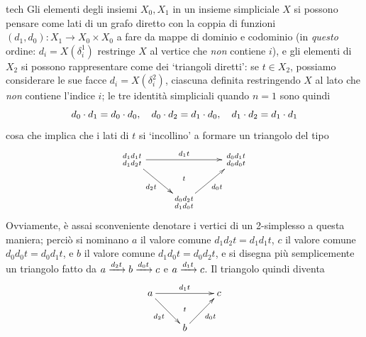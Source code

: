 \begin{hRemark}{tech}
 Gli elementi degli insiemi \(X_0, X_1\) in un insieme simpliciale \(X\) si possono pensare come lati di un grafo diretto con la coppia di funzioni \((d_1,d_0) \colon X_1 \to X_0\times X_0\) a fare da mappe di dominio e codominio (in \emph{questo} ordine: \(d_i = X(\delta^1_i)\) restringe \(X\) al vertice che \emph{non} contiene \(i\)), e gli elementi di \(X_2\) si possono rappresentare come dei `triangoli diretti': se \(t\in X_2\), possiamo considerare le sue facce \(d_i = X(\delta^2_i)\), ciascuna definita restringendo \(X\) al lato che \emph{non} contiene l'indice \(i\); le tre identità simpliciali quando \(n=1\) sono quindi
 \[
  d_0\cdot d_1 = d_0\cdot d_0,\quad
  d_0\cdot d_2 = d_1\cdot d_0,\quad
  d_1\cdot d_2 = d_1\cdot d_1
 \]
 cosa che implica che i lati di \(t\) si `incollino' a formare un triangolo del tipo
 \[\xymatrix{
   {\begin{smallmatrix}
      d_1d_1t \\
      d_1d_2t
     \end{smallmatrix}}
   \ar[rr]^{d_1t}\ar[dr]_{d_2t}&& {\begin{smallmatrix}
      d_0d_1t \\
      d_0d_0t
     \end{smallmatrix}}
   \\
   &{\begin{smallmatrix}
      d_0d_2t \\
      d_1d_0t
     \end{smallmatrix}}\ar[ur]_{d_0t}\ar@{}[u]|-t &
  }\]
 Ovviamente, è assai sconveniente denotare i vertici di un 2-simplesso a questa maniera; perciò si nominano \(a\) il valore comune \(d_1d_2t = d_1d_1t\), \(c\) il valore comune \(d_0d_0t = d_0d_1t\), e \(b\) il valore comune \(d_1d_0t = d_0d_2t\), e si disegna più semplicemente un triangolo fatto da \(a \xrightarrow{d_2t} b \xrightarrow{d_0t} c\) e \(a \xrightarrow{d_1t} c\). Il triangolo quindi diventa
 \[\xymatrix{
  a\ar[dr]_{d_2t} \ar[rr]^{d_1t} &\ar@{}[d]|-{t} & c \\
  & b\ar[ur]_{d_0t}
  }\]
\end{hRemark}
